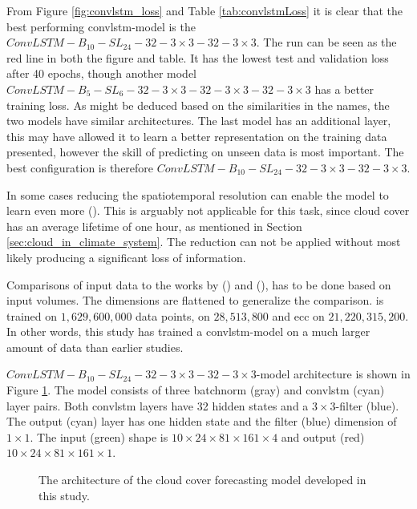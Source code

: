 
From Figure \ref{fig:convlstm_loss} and Table \ref{tab:convlstmLoss}  it is clear that the best performing \acrshort{convlstm}-model is the $ConvLSTM-B_{10}-SL_{24}-32-3\times3-32-3 \times3$. The run can be seen as the red line in both the figure and table. It has the lowest test and validation loss after 40 epochs, though another model $ConvLSTM-B_{5}-SL_{6}-32-3\times3-32-3 \times3-32-3 \times3$ has a better training loss. As might be deduced based on the similarities in the names, the two models have similar architectures.
The last model has an additional layer, this may have allowed it to learn a better representation on the training data presented, however the skill of predicting on unseen data is most important. The best configuration is therefore $ConvLSTM-B_{10}-SL_{24}-32-3\times3-32-3 \times3$.

In some cases reducing the spatiotemporal resolution can enable the model to learn even more (\cite{precip_nowcasting}). This is arguably not applicable for this task, since cloud cover has an average lifetime of one hour, as mentioned in Section \ref{sec:cloud_in_climate_system}. The reduction can not be applied without most likely producing a significant loss of information.

Comparisons of input data to the works by \citeauthor{precip_nowcasting} (\citeyear{precip_nowcasting}) and \citeauthor{SunAirLSTM} (\citeyear{SunAirLSTM}), has to be done based on input volumes. The dimensions are flattened to generalize the comparison.  is trained on $1,629,600,000$ data points,  on $28,513,800$ and \acrshort{ecc} on $21,220,315,200$. %
In other words, this study has trained a \acrshort{convlstm}-model on a much larger amount of data than earlier studies. %

$ConvLSTM-B_{10}-SL_{24}-32-3\times3-32-3 \times3$-model architecture is shown in Figure \ref{fig:best_ml_architecture}. The model consists of three \acrshort{batchnorm} (gray) and \acrshort{convlstm} (cyan)  layer pairs. Both \acrshort{convlstm} layers have 32 hidden states and a $3\times 3$-filter (blue). The output (cyan) layer has one hidden state and the filter (blue) dimension of $1\times 1$. The input (green) shape is $10\times24\times81\times161\times4$ and output (red) $10\times24\times81\times161\times1$. 
\begin{figure}
    \centering
    
    \caption{The architecture of the cloud cover forecasting model developed in this study.}
    \label{fig:best_ml_architecture}
\end{figure}

